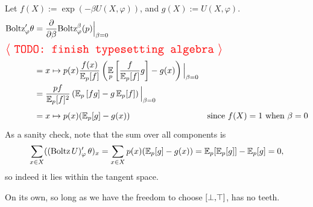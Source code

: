 \begin{subappendices}
    \begin{lproof}\label{proof:bolz-fields}
    	Let $f(X) := \exp(-\beta U(X,\varphi))$, and $g(X) := U(X,\varphi)$.
    	\begin{align*}
    		\mathrm{Boltz}'_\varphi\theta &= \frac{\partial}{\partial \beta} \mathrm{Boltz}^\beta_\varphi(p) \Big|_{\beta=0} \\
    	\intertext{\TODO[TODO: finish typesetting algebra]}
    		&= x \mapsto
    			p(x) \frac{f(x)}{\Ex_p[f]}
    				\left(\Ex_p\left[ \frac{f}{\Ex_{p}[f]} g\right] - g(x) \right)
    				\Big|_{\beta=0}
    				\\
    		&= \frac{pf}{\Ex_p[f]^2}
    			\left(\Ex\nolimits_p\left[ f g\right] - g \Ex\nolimits_{p}[f] \right)
    			\Big|_{\beta=0} \\
    		&= x \mapsto p(x) (\Ex\nolimits_p[g] - g(x)) &
    			\text{since $f(X) = 1$ when $\beta=0$}
    	\end{align*}
    	As a sanity check, note that the sum over all components is
    	\[ \sum_{x \in X} ((\mathrm{Boltz}\,U)'_\varphi\, \theta)_x
    		 = \sum_{x \in X} p(x) (\operatorname*{\mathbb{E}}\nolimits_p[g] - g(x))
    		 = \operatorname*{\mathbb{E}}\nolimits_p[ \operatorname*{\mathbb{E}}\nolimits_p [ g ]] - \operatorname*{\mathbb{E}}\nolimits_p [g] = 0,
    	 \]
    	 so indeed it lies within the tangent space.
    \end{lproof}
	


    On its own, so long as we have the freedom to choose $[\bot,\!\top]$,  has no teeth.


\end{subappendices}
